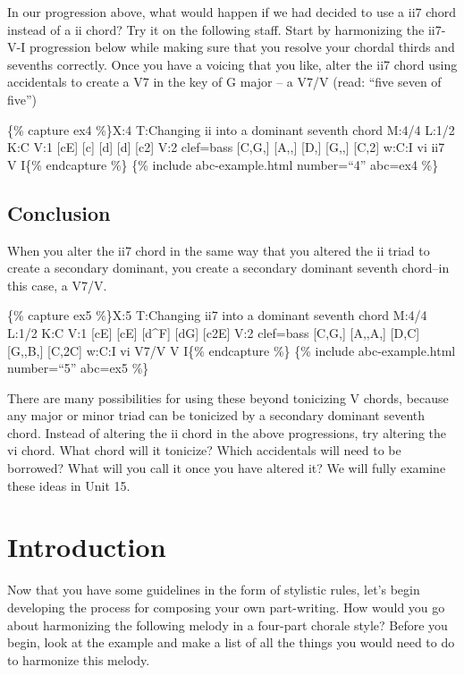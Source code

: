 \documentclass{book}
\begin{document}
In our progression above, what would happen if we had decided to use a ii7
chord instead of a ii chord? Try it on the following staff. Start by
harmonizing the ii7-V-I progression below while making sure that you resolve
your chordal thirds and sevenths correctly. Once you have a voicing that you
like, alter the ii7 chord using accidentals to create a V7 in the key of G
major -- a V7/V (read: ``five seven of five'')

\{\% capture ex4 \%\}X:4 T:Changing ii into a dominant seventh chord M:4/4
L:1/2 K:C V:1 {[}cE{]} {[}c{]}\textbar{} {[}d{]} {[}d{]}\textbar{}
{[}c2{]}\textbar{]} V:2 clef=bass {[}C,G,{]} {[}A,,{]}\textbar{} {[}D,{]}
{[}G,,{]}\textbar{} {[}C,2{]}\textbar{]} w:C:I vi ii7 V I\{\% endcapture \%\}
\{\% include abc-example.html number=``4'' abc=ex4 \%\}

\hypertarget{conclusion-6}{%
\subsection{Conclusion}\label{conclusion-6}}

When you alter the ii7 chord in the same way that you altered the ii triad to
create a secondary dominant, you create a secondary dominant seventh chord--in
this case, a V7/V.

\{\% capture ex5 \%\}X:5 T:Changing ii7 into a dominant seventh chord M:4/4
L:1/2 K:C V:1 {[}cE{]} {[}cE{]}\textbar{} {[}d\^{}F{]} {[}dG{]}\textbar{}
{[}c2E{]}\textbar{]} V:2 clef=bass {[}C,G,{]} {[}A,,A,{]}\textbar{} {[}D,C{]}
{[}G,,B,{]}\textbar{} {[}C,2C{]}\textbar{]} w:C:I vi V7/V V I\{\% endcapture
\%\} \{\% include abc-example.html number=``5'' abc=ex5 \%\}

There are many possibilities for using these beyond tonicizing V chords,
because any major or minor triad can be tonicized by a secondary dominant
seventh chord. Instead of altering the ii chord in the above progressions, try
altering the vi chord. What chord will it tonicize? Which accidentals will
need to be borrowed? What will you call it once you have altered it? We will
fully examine these ideas in Unit 15.

\hypertarget{introduction}{%
\section{Introduction}\label{introduction}}

Now that you have some guidelines in the form of stylistic rules, let's begin
developing the process for composing your own part-writing. How would you go
about harmonizing the following melody in a four-part chorale style? Before
you begin, look at the example and make a list of all the things you would
need to do to harmonize this melody.
\end{document}
